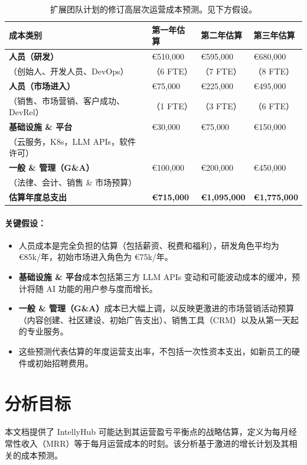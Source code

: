\documentclass[11pt, a4paper, oneside]{article}
\begin{document}
\begin{table}[H]
\centering
\begin{tabularx}{\textwidth}{L L L L}
\toprule
\textbf{成本类别} & \textbf{第一年估算} & \textbf{第二年估算} & \textbf{第三年估算} \\
\midrule
\textbf{人员（研发）} & €510,000 & €595,000 & €680,000 \\
（创始人、开发人员、DevOps） & （6 FTE） & （7 FTE） & （8 FTE） \\
\addlinespace
\textbf{人员（市场进入）} & €75,000 & €225,000 & €495,000 \\
（销售、市场营销、客户成功、DevRel） & （1 FTE） & （3 FTE） & （6 FTE） \\
\addlinespace
\textbf{基础设施 \& 平台} & €30,000 & €75,000 & €150,000 \\
（云服务，K8s，LLM APIs，软件许可） & & & \\
\addlinespace
\textbf{一般 \& 管理（G\&A）} & €100,000 & €200,000 & €450,000 \\
（法律、会计、销售 \& 市场预算） & & & \\
\midrule
\textbf{估算年度总支出} & \textbf{€715,000} & \textbf{€1,095,000} & \textbf{€1,775,000} \\
\bottomrule
\end{tabularx}
\caption{扩展团队计划的修订高层次运营成本预测。见下方假设。}
\label{tab:cost_projections_expanded_team}
\end{table}

\paragraph*{关键假设：}
\begin{itemize}
    \item 人员成本是完全负担的估算（包括薪资、税费和福利），研发角色平均为 €85k/年，初始市场进入角色为 €75k/年。
    \item \textbf{基础设施 \& 平台}成本包括第三方 LLM APIs 变动和可能波动成本的缓冲，预计将随 AI 功能的用户参与度而增长。
    \item \textbf{一般 \& 管理（G\&A）}成本已大幅上调，以反映更激进的市场营销活动预算（内容创建、社区建设、初始广告支出）、销售工具（CRM）以及从第一天起的专业服务。
    \item 这些预测代表估算的年度运营支出率，不包括一次性资本支出，如新员工的硬件或初始招聘费用。
\end{itemize}

\section{分析目标}
本文档提供了 IntellyHub 可能达到其运营盈亏平衡点的战略估算，定义为每月经常性收入（MRR）等于每月运营成本的时刻。该分析基于激进的增长计划及其相关的成本预测。
\end{document}
